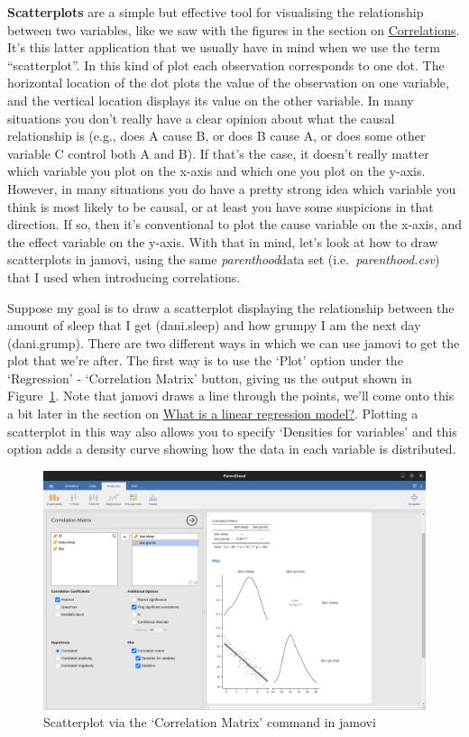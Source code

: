 \documentclass[
  a4paper,
]{book}
\begin{document}
\textbf{Scatterplots} are a simple but effective tool for visualising
the relationship between two variables, like we saw with the figures in
the section on \protect\hyperlink{correlations}{Correlations}. It's this
latter application that we usually have in mind when we use the term
``scatterplot''. In this kind of plot each observation corresponds to
one dot. The horizontal location of the dot plots the value of the
observation on one variable, and the vertical location displays its
value on the other variable. In many situations you don't really have a
clear opinion about what the causal relationship is (e.g., does A cause
B, or does B cause A, or does some other variable C control both A and
B). If that's the case, it doesn't really matter which variable you plot
on the x-axis and which one you plot on the y-axis. However, in many
situations you do have a pretty strong idea which variable you think is
most likely to be causal, or at least you have some suspicions in that
direction. If so, then it's conventional to plot the cause variable on
the x-axis, and the effect variable on the y-axis. With that in mind,
let's look at how to draw scatterplots in jamovi, using the same
\emph{parenthood}data set (i.e.~\emph{parenthood.csv}) that I used when
introducing correlations.

Suppose my goal is to draw a scatterplot displaying the relationship
between the amount of sleep that I get (dani.sleep) and how grumpy I am
the next day (dani.grump). There are two different ways in which we can
use jamovi to get the plot that we're after. The first way is to use the
`Plot' option under the `Regression' - `Correlation Matrix' button,
giving us the output shown in Figure~\ref{fig-fig12-8}. Note that jamovi
draws a line through the points, we'll come onto this a bit later in the
section on \protect\hyperlink{what-is-a-linear-regression-model}{What is
a linear regression model?}. Plotting a scatterplot in this way also
allows you to specify `Densities for variables' and this option adds a
density curve showing how the data in each variable is distributed.

\begin{figure}

\includegraphics[width=1\textwidth,height=\textheight]{images/fig12-8.png} \hfill{}

\caption{\label{fig-fig12-8}Scatterplot via the `Correlation Matrix'
command in jamovi}

\end{figure}
\end{document}
